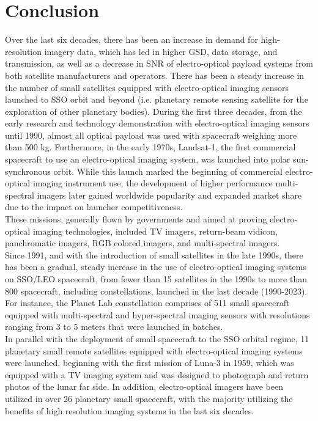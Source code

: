 \documentclass[final,5p,times,sort&compress,twocolumn]{elsarticle}
\begin{document}
\section{Conclusion}
\label{Section 7 }
Over the last six decades, there has been an increase in demand for high-resolution imagery data, which has led in higher GSD, data storage, and transmission, as well as a decrease in SNR of electro-optical payload systems from both satellite manufacturers and operators.  There has been a steady increase in the number of small satellites equipped with electro-optical imaging sensors launched to SSO orbit and beyond (i.e. planetary remote sensing satellite for the exploration of other planetary bodies). 
During the first three decades, from the early research and technology demonstration with electro-optical imaging sensors until 1990, almost all optical payload was used with spacecraft weighing more than 500 kg. Furthermore, in the early 1970s, Landsat-1, the first commercial spacecraft to use an electro-optical imaging system, was launched into polar sun-synchronous orbit. While this launch marked the beginning of commercial electro-optical imaging instrument use, the development of higher performance multi-spectral imagers later gained worldwide popularity and expanded market share due to the impact on launcher competitiveness.\\
These missions, generally flown by governments and aimed at proving electro-optical imaging technologies, included TV imagers, return-beam vidicon, panchromatic imagers, RGB colored imagers, and multi-spectral imagers.\\
Since 1991, and with the introduction of small satellites in the late 1990s, there has been a gradual, steady increase in the use of electro-optical imaging systems on SSO/LEO spacecraft, from fewer than 15 satellites in the 1990s to more than 800 spacecraft, including constellations, launched in the last decade (1990-2023).  For instance, the Planet Lab constellation comprises of 511 small spacecraft equipped with multi-spectral and hyper-spectral imaging sensors with resolutions ranging from 3 to 5 meters that were launched in batches. \\
In parallel with the deployment of small spacecraft to the SSO orbital regime, 11 planetary small remote satellites equipped with electro-optical imaging systems were launched, beginning with the first mission of Luna-3 in 1959, which was equipped with a TV imaging system and was designed to photograph and return photos of the lunar far side. In addition, electro-optical imagers have been utilized in over 26 planetary small spacecraft, with the majority utilizing the benefits of high resolution imaging systems in the last six decades. \\
\end{document}
